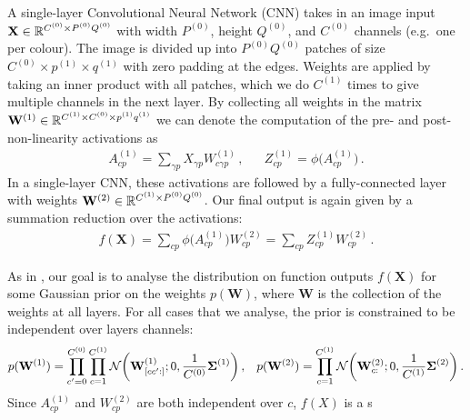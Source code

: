 \documentclass{article}
\theoremstyle{definition}
\newcommand{\vX}{\mathbf{X}}
\newcommand{\vW}{\mathbf{W}}
\begin{document}
\newcommand{\layerC}[1]{C^{(#1)}}
\newcommand{\layerw}[1]{P^{(#1)}}
\newcommand{\layerh}[1]{Q^{(#1)}}
\newcommand{\layersize}[1]{\layerw{#1}\layerh{#1}}
\newcommand{\patchw}[1]{p^{(#1)}}
\newcommand{\patchh}[1]{q^{(#1)}}
\newcommand{\patchsize}[1]{\patchw{#1}\patchh{#1}}
\newcommand{\patchidx}{\nu}
\newcommand{\W}[1]{\vW}
\newcommand{\layerWs}[1]{W^{(#1)}}
\newcommand{\layerW}[1]{\vW^{(#1)}}
\newcommand{\priorWcov}[1]{\boldsymbol{\Sigma}^{(#1)}}
\newcommand{\layerAs}[1]{A^{(#1)}}
\newcommand{\layerNLAs}[1]{Z^{(#1)}}
\newcommand{\chan}{c}
\newcommand{\prevchan}{\gamma}   %
\newcommand{\patch}{p}               %
\newcommand{\nextpatch}{\mu} 
A single-layer Convolutional Neural Network (CNN) takes in an image input $\vX \in \Reals^{\layerC{0}\times \layersize{0}}$ with width $\layerw{0}$, height $\layerh{0}$, and $\layerC{0}$ channels (e.g.~one per colour). The image is divided up into $\layersize{0}$ patches of size $\layerC{0}\times\!\patchw{1}\times\!\patchh{1}$ with zero padding at the edges. Weights are applied by taking an inner product with all patches, which we do $\layerC{1}$ times to give multiple channels in the next layer. By collecting all weights in the matrix $\layerW{1}\in\Reals^{\layerC1\times \layerC0\times \patchw1\patchh1}$ we can denote the computation of the pre- and post-non-linearity activations as
\begin{align}
    \layerAs1_{cp} = \sum_{\gamma p} X_{\gamma p} \layerWs1_{c\gamma p} \,, && \layerNLAs1_{cp} = \phi\big(\layerAs1_{cp}\big)\,.
\end{align}
In a single-layer CNN, these activations are followed by a fully-connected layer with weights $\layerW{2} \in \Reals^{\layerC 1\times \layerw0\layerh0}$. Our final output is again given by a summation reduction over the activations:
\begin{align}
    f(\vX) = \sum_{cp} \phi\big(\layerAs1_{cp}\big) W^{(2)}_{cp} = \sum_{cp} \layerNLAs1_{cp}\layerWs2_{cp} \,.
\end{align}

As in \citet{garriga2018infiniteconv,novak2019infiniteconv}, our goal is to analyse the distribution on function outputs $f(\vX)$ for some Gaussian prior on the weights $p(\vW)$, where $\vW$ is the collection of the weights at all layers. For all cases that we analyse, the prior is constrained to be independent over layers channels:
\begin{align}
    p(\layerW1) = \prod_{c'=0}^{\layerC0}\prod_{c=1}^{\layerC1}\NormDist{\layerW1_{[cc':]}; 0, \frac{1}{\layerC0}\priorWcov1} \,,
    && p(\layerW2) = \prod_{c=1}^{\layerC1} \NormDist{\layerW2_{c:}; 0, \frac{1}{\layerC1}\priorWcov2} \,.
\end{align}
Since $\layerAs1_{cp}$ and $\layerWs2_{cp}$ are both independent over $c$, $f(X)$ is a s
\end{document}
